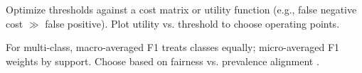\begin{example}
Optimize thresholds against a cost matrix or utility function (e.g., false negative cost \(\gg\) false positive). Plot utility vs. threshold to choose operating points.
\end{example}

\begin{example}
For multi-class, macro-averaged F1 treats classes equally; micro-averaged F1 weights by support. Choose based on fairness vs. prevalence alignment \textcite{Prince2023}.
\end{example}

